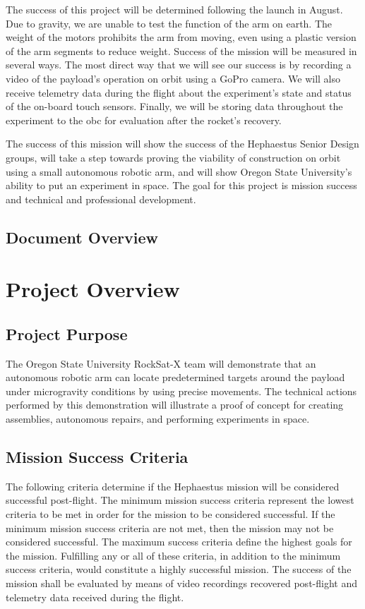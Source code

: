 \documentclass[letterpaper,10pt]{article}
\begin{document}
The success of this project will be determined following the launch in August. Due to gravity, we are unable to test the function of the arm on earth. The weight of the motors prohibits the arm from moving, even using a plastic version of the arm segments to reduce weight. Success of the mission will be measured in several ways. The most direct way that we will see our success is by recording a video of the payload's operation on orbit using a GoPro camera. We will also receive telemetry data during the flight about the experiment's state and status of the on-board touch sensors. Finally, we will be storing data throughout the experiment to the \gls{obc} for evaluation after the rocket's recovery.

The success of this mission will show the success of the Hephaestus Senior Design groups, will take a step towards proving the viability of construction on orbit using a small autonomous robotic arm, and will show Oregon State University's ability to put an experiment in space. The goal for this project is mission success and technical and professional development.

\subsection{Document Overview}

\section{Project Overview}
\subsection{Project Purpose}
The Oregon State University RockSat-X team will demonstrate that an autonomous robotic arm can locate predetermined
 targets around the \gls{payload} under microgravity conditions by using precise movements. 
The technical actions performed by this demonstration will illustrate a proof of concept for creating assemblies, 
autonomous repairs, and performing experiments in space.

\subsection{Mission Success Criteria}
The following criteria determine if the Hephaestus mission will be considered successful post-flight.
The minimum mission success criteria represent the lowest criteria to be met in order for the mission to be considered successful.
If the minimum mission success criteria are not met, then the mission may not be considered successful.
The maximum success criteria define the highest goals for the mission.
Fulfilling any or all of these criteria, in addition to the minimum success criteria, would constitute a highly successful mission.
The success of the mission shall be evaluated by means of video recordings recovered post-flight and telemetry data received during the flight.
\end{document}
